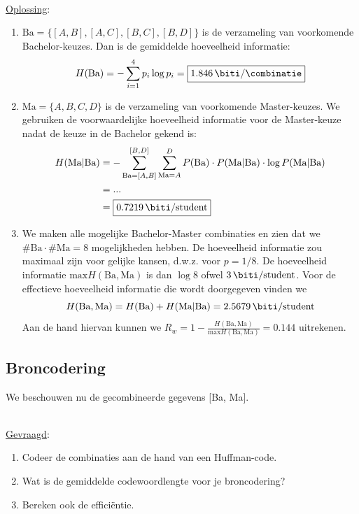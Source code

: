 \documentclass[kulak]{kulakarticle}
\begin{document}
	\hfill \\
	\underline{Oplossing}:
	\begin{enumerate}
		\item \( \text{Ba}=\{ [A,B], [A,C], [B,C], [B,D] \} \) is de verzameling van voorkomende Bachelor-keuzes. Dan is de gemiddelde hoeveelheid informatie: \[ H(\text{Ba})= - \sum_{i=1}^{4} p_i \log{p_i} = \boxed{\SI{1.846}{\biti \per \combinatie}} \]

		\item \( \text{Ma}=\{ A,B,C,D \} \) is de verzameling van voorkomende Master-keuzes.
		We gebruiken de voorwaardelijke hoeveelheid informatie voor de Master-keuze nadat de keuze in de Bachelor gekend is: \begin{align*}
			H(\text{Ma}|\text{Ba}) &= -\sum_{\text{Ba}=[A,B]}^{[B,D]}\sum_{\text{Ma}=A}^{D} P(\text{Ba})\cdot P(\text{Ma}|\text{Ba})\cdot \log{P(\text{Ma}|\text{Ba})} \\
			&= ... \\
			&= \boxed{\SI{0.7219}{\biti \per student}}
		\end{align*}

		\item We maken alle mogelijke Bachelor-Master combinaties en zien dat we \(\#\text{Ba} \cdot \#\text{Ma} = 8\) mogelijkheden hebben. De hoeveelheid informatie zou maximaal zijn voor gelijke kansen, d.w.z. voor \(p=1/8\). De hoeveelheid informatie \(\text{max} H(\text{Ba}, \text{Ma})\) is dan \(\log{8}\) ofwel \(\SI{3}{\biti \per student}\). Voor de effectieve hoeveelheid informatie die wordt doorgegeven vinden we \[H(\text{Ba}, \text{Ma}) = H(\text{Ba}) + H(\text{Ma} | \text{Ba}) = \SI{2.5679}{\biti \per student} \] Aan de hand hiervan kunnen we \(R_w = 1 - \frac{H(\text{Ba}, \text{Ma})}{\text{max} H(\text{Ba}, \text{Ma})} = \boxed{0.144}\) uitrekenen.
	\end{enumerate}

	\subsection{Broncodering}

	We beschouwen nu de gecombineerde gegevens [Ba, Ma].

	\hfill \\
	\underline{Gevraagd}:
	\begin{enumerate}
		\item Codeer de combinaties aan de hand van een Huffman-code.
		\item Wat is de gemiddelde codewoordlengte voor je broncodering?
		\item Bereken ook de efficiëntie.
	\end{enumerate}
\end{document}
